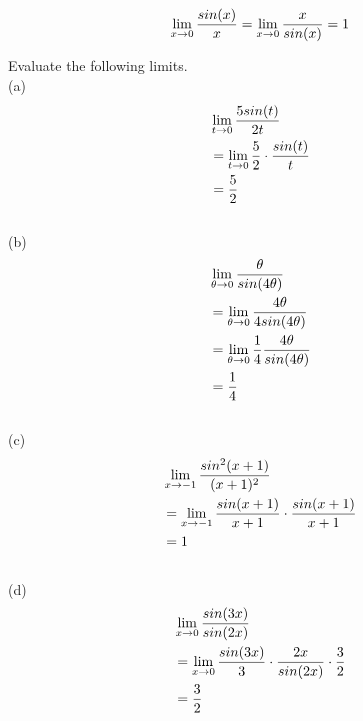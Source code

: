 \begin{theorem}
	\begin{align}
		\lim\limits_{x \rightarrow 0}{sin(x) \over x} = \lim\limits_{x \rightarrow 0}{x \over sin(x)} = 1
	\end{align}
\end{theorem}

\begin{exercise}\nonumber
	Evaluate the following limits. \\

	(a)
	\begin{align}
		 & \lim\limits_{t \rightarrow 0}{5sin(t) \over 2t}                     \\
		 & = \lim\limits_{t \rightarrow 0}{{5 \over 2} \cdot {sin(t) \over t}} \\
		 & = {5 \over 2}
	\end{align}
	\\

	(b)
	\begin{align}
		 & \lim\limits_{\theta \rightarrow 0}{\theta \over sin(4\theta)}                 \\
		 & = \lim\limits_{\theta \rightarrow 0}{4\theta \over 4sin(4\theta)}             \\
		 & = \lim\limits_{\theta \rightarrow 0}{{1 \over 4}{4\theta \over sin(4\theta)}} \\
		 & = {1 \over 4}
	\end{align}
	\\

	(c)
	\begin{align}
		 & \lim\limits_{x \rightarrow -1}{sin^2(x+1) \over (x+1)^2}                          \\
		 & = \lim\limits_{x \rightarrow -1}{{sin(x+1) \over x+1} \cdot {sin(x+1) \over x+1}} \\
		 & = 1
	\end{align}
	\\

	(d)
	\begin{align}
		 & \lim\limits_{x \rightarrow 0}{sin(3x) \over sin(2x)}                                          \\
		 & = \lim\limits_{x \rightarrow 0}{{sin(3x) \over 3} \cdot {2x \over sin(2x)} \cdot {3 \over 2}} \\
		 & = {3 \over 2}
	\end{align}
	\\


\end{exercise}
